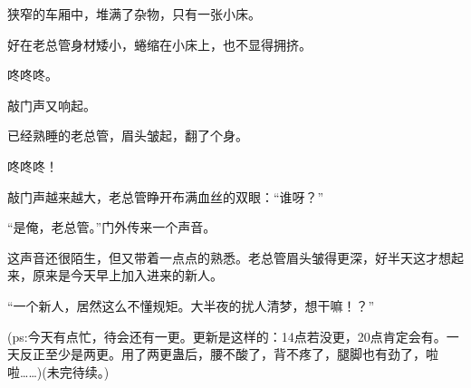 \begin{this_body}
狭窄的车厢中，堆满了杂物，只有一张小床。

好在老总管身材矮小，蜷缩在小床上，也不显得拥挤。

咚咚咚。

敲门声又响起。

已经熟睡的老总管，眉头皱起，翻了个身。

咚咚咚！

敲门声越来越大，老总管睁开布满血丝的双眼：“谁呀？”

“是俺，老总管。”门外传来一个声音。

这声音还很陌生，但又带着一点点的熟悉。老总管眉头皱得更深，好半天这才想起来，原来是今天早上加入进来的新人。

“一个新人，居然这么不懂规矩。大半夜的扰人清梦，想干嘛！？”

(ps:今天有点忙，待会还有一更。更新是这样的：14点若没更，20点肯定会有。一天反正至少是两更。用了两更蛊后，腰不酸了，背不疼了，腿脚也有劲了，啦啦……)(未完待续。)

\end{this_body}

